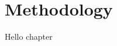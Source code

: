 \documentclass[../Main_PhD_Dissertation.tex]{subfiles}
\begin{document}
	
	\chapter{Methodology}
	\label{chap:Methodology}
	
	Hello chapter
	
	
\end{document}
